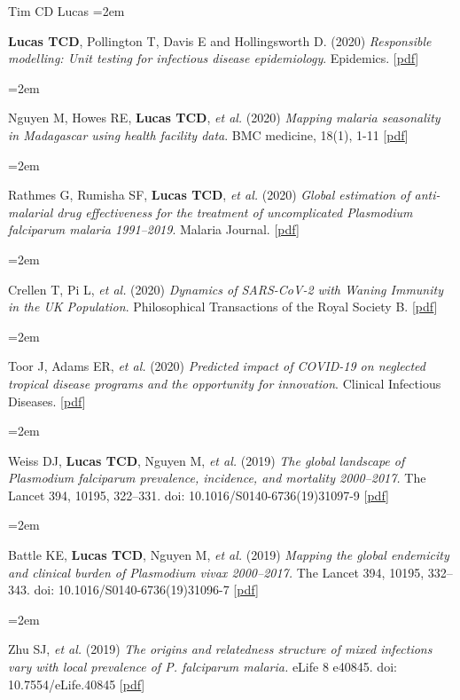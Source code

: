 \documentclass{scrartcl}
\newcommand{\MarginText}[1]{\marginpar{\raggedleft\itshape\small#1}} %
\newcommand{\Description}[1]{\hangindent=2em\hangafter=0\noindent\raggedright\footnotesize{#1}\par\normalsize\vspace{1em}} %
\begin{document}
\begin{cv}{Tim {\Large CD} Lucas}
\Description{\textbf{Lucas TCD}, Pollington T, Davis E and Hollingsworth D. (2020) \emph{Responsible modelling: Unit testing for infectious disease epidemiology}. Epidemics. [\href{https://www.sciencedirect.com/science/article/pii/S1755436520300451}{pdf}]}



\Description{Nguyen M, Howes RE, \textbf{Lucas TCD},  \emph{et al.} (2020) \emph{Mapping malaria seasonality in Madagascar using health facility data}. BMC medicine, 18(1), 1-11 [\href{https://bmcmedicine.biomedcentral.com/track/pdf/10.1186/s12916-019-1486-3}{pdf}]}


\Description{Rathmes G, Rumisha SF, \textbf{Lucas TCD}, \emph{et al.} (2020) \emph{Global estimation of anti-malarial drug effectiveness for the treatment of uncomplicated \emph{Plasmodium falciparum} malaria 1991--2019}. Malaria Journal. [\href{https://link.springer.com/article/10.1186/s12936-020-03446-8}{pdf}]}

\Description{Crellen T, Pi L, \emph{et al.} (2020) \emph{Dynamics of SARS-CoV-2 with Waning Immunity in the UK Population}. Philosophical Transactions of the Royal Society B. [\href{https://royalsocietypublishing.org/doi/full/10.1098/rstb.2020.0274}{pdf}]}


\Description{Toor J, Adams ER, \emph{et al.} (2020) \emph{Predicted impact of COVID-19 on neglected tropical disease programs and the opportunity for innovation}. Clinical Infectious Diseases. [\href{https://www.ncbi.nlm.nih.gov/pmc/articles/PMC7543306/}{pdf}]}



\Description{\MarginText{2019}Weiss DJ, \textbf{Lucas TCD}, Nguyen M, \emph{et al.} (2019) \emph{The global landscape of \emph{Plasmodium falciparum} prevalence, incidence, and mortality 2000--2017.} The Lancet 394, 10195, 322--331. doi: 10.1016/S0140-6736(19)31097-9 [\href{https://doi.org/10.1016/S0140-6736(19)31097-9}{pdf}]}

\Description{Battle KE, \textbf{Lucas TCD},  Nguyen M, \emph{et al.} (2019) \emph{Mapping the global endemicity and clinical burden of \emph{Plasmodium vivax} 2000--2017.} The Lancet 394, 10195, 332--343. doi: 10.1016/S0140-6736(19)31096-7 [\href{https://doi.org/10.1016/S0140-6736(19)31096-7}{pdf}]}



\Description{Zhu SJ, \emph{et al.} (2019) \emph{The origins and relatedness structure of mixed infections vary with local prevalence of \emph{P. falciparum} malaria.} eLife 8 e40845. doi: 10.7554/eLife.40845 [\href{https://doi.org/10.7554/eLife.40845}{pdf}]}





\end{cv}
\end{document}
